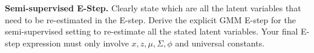 \item{} \textbf{Semi-supervised E-Step.}
Clearly state which are all the latent variables that need to be re-estimated in the E-step. Derive the explicit GMM E-step for the semi-supervised setting to re-estimate all the stated latent variables. Your final E-step expression must only involve $x, z, \mu, \Sigma, \phi$ and universal constants.

